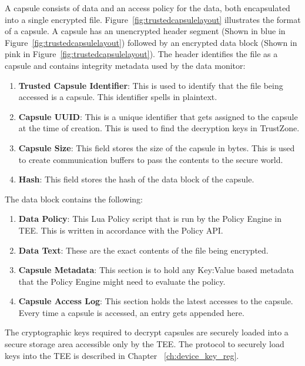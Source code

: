 A capsule consists of data and an access policy for the data, both encapsulated
into a single encrypted file. Figure~\ref{fig:trustedcapsulelayout} illustrates
the format of a capsule. A capsule has an unencrypted header segment (Shown in blue in Figure~\ref{fig:trustedcapsulelayout}) followed by an
encrypted data block (Shown in pink in Figure~\ref{fig:trustedcapsulelayout}). The header identifies the file as a capsule and contains
integrity metadata used by the data monitor:
\begin{enumerate}
    \item \textbf{Trusted Capsule Identifier}: This is used to identify that the file being accessed is a capsule. This identifier spells  in plaintext.
    \item \textbf{Capsule UUID}: This is a unique identifier that gets assigned to the capsule at the time of creation. This is used to find the decryption keys in TrustZone.
    \item \textbf{Capsule Size}: This field stores the size of the capsule in bytes. This is used to create communication buffers to pass the contents to the secure world.
    \item \textbf{Hash}: This field stores the hash of the data block of the capsule.
\end{enumerate}


The data block contains the following:
\begin{enumerate}
    \item \textbf{Data Policy}: This Lua Policy script that is run by the Policy Engine in TEE. This is written in accordance with the Policy API.
    \item \textbf{Data Text}: These are the exact contents of the file being encrypted.
    \item \textbf{Capsule Metadata}: This section is to hold any Key:Value based metadata that the Policy Engine might need to evaluate the policy.
    \item \textbf{Capsule Access Log}: This section holds the latest accesses to the capsule. Every time a capsule is accessed, an entry gets appended here.
\end{enumerate}

The cryptographic keys required to decrypt capsules are securely loaded into a secure storage area accessible only by the TEE. The protocol to securely load keys into the TEE is described in Chapter ~\ref{ch:device_key_reg}.
%

